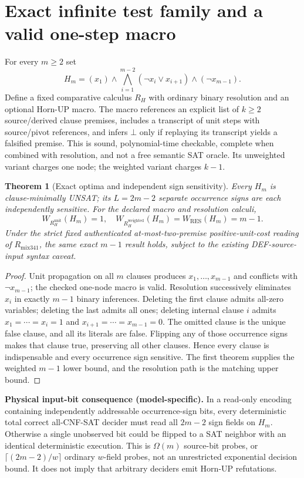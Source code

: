 \documentclass[11pt]{article}
\newtheorem{theorem}{Theorem}
\begin{document}
\section*{Exact infinite test family and a valid one-step macro}
For every $m\ge2$ set
\[
H_m=(x_1)\wedge\bigwedge_{i=1}^{m-2}(\neg x_i\vee x_{i+1})\wedge(\neg x_{m-1}).
\]
Define a fixed comparative calculus $R_H$ with ordinary binary resolution and an optional Horn-UP macro. The macro references an explicit list of $k\ge2$ source/derived clause premises, includes a transcript of unit steps with source/pivot references, and infers $\bot$ only if replaying its transcript yields a falsified premise. This is sound, polynomial-time checkable, complete when combined with resolution, and not a free semantic SAT oracle. Its unweighted variant charges one node; the weighted variant charges $k-1$.

\begin{theorem}[Exact optima and independent sign sensitivity]
Every $H_m$ is clause-minimally UNSAT; its $L=2m-2$ separate occurrence signs are each independently sensitive. For the declared macro and resolution calculi,
\[
W_{R_H^{\mathrm{unit}}}(H_m)=1,\quad
W_{R_H^{\mathrm{weighted}}}(H_m)=W_{\mathrm{RES}}(H_m)=m-1.
\]
Under the strict fixed authenticated at-most-two-premise positive-unit-cost reading of $R_{\mathrm{mix341}}$, the same exact $m-1$ result holds, subject to the existing DEF-source-input syntax caveat.
\end{theorem}
\begin{proof}
Unit propagation on all $m$ clauses produces $x_1,\ldots,x_{m-1}$ and conflicts with $\neg x_{m-1}$; the checked one-node macro is valid. Resolution successively eliminates $x_i$ in exactly $m-1$ binary inferences. Deleting the first clause admits all-zero variables; deleting the last admits all ones; deleting internal clause $i$ admits $x_1=\cdots=x_i=1$ and $x_{i+1}=\cdots=x_{m-1}=0$. The omitted clause is the unique false clause, and all its literals are false. Flipping any of those occurrence signs makes that clause true, preserving all other clauses. Hence every clause is indispensable and every occurrence sign sensitive. The first theorem supplies the weighted $m-1$ lower bound, and the resolution path is the matching upper bound.
\end{proof}

\noindent\textbf{Physical input-bit consequence (model-specific).}
In a read-only encoding containing independently addressable occurrence-sign bits, every deterministic total correct all-CNF-SAT decider must read all $2m-2$ sign fields on $H_m$. Otherwise a single unobserved bit could be flipped to a SAT neighbor with an identical deterministic execution. This is $\Omega(m)$ source-bit probes, or $\lceil(2m-2)/w\rceil$ ordinary $w$-field probes, not an unrestricted exponential decision bound. It does not imply that arbitrary deciders emit Horn-UP refutations.
\end{document}
